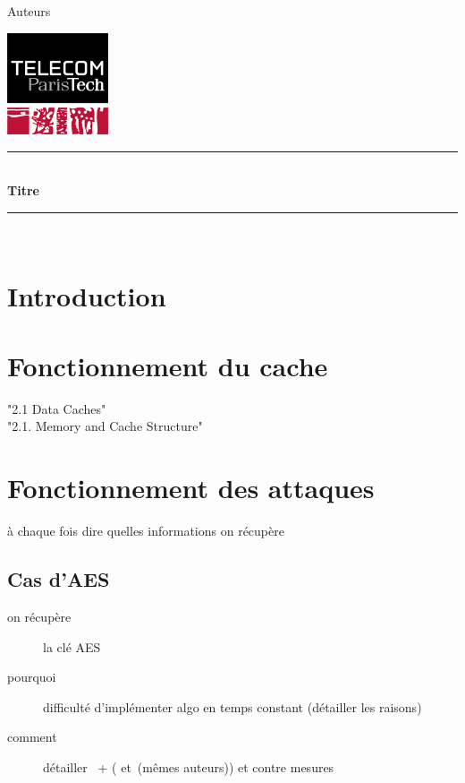 \documentclass[a4paper,11pt]{article}
\newcommand{\HRule}{\rule{\linewidth}{0.5mm}}
\newcommand{\reporttitle}{Titre}
\newcommand{\reportauthor}{Auteurs}
\begin{document}
	

\begin{center}

\begin{minipage}[t]{0.4\textwidth}
  \begin{flushleft} \large
    \reportauthor
  \vfill
  \end{flushleft}
\end{minipage}
\begin{minipage}[t]{0.5\textwidth}
  \begin{flushright}
  \includegraphics [width=30mm]{figures/tpt.jpg} \\[0.5cm]
  \end{flushright}
\end{minipage}
\HRule \\[0.5cm]
{\huge \bfseries \reporttitle}\\[0.3cm]
\HRule \\[1.5cm]

\end{center}

\section*{Introduction}

\section{Fonctionnement du cache}
"2.1 Data Caches"~\cite{brumley2009cache}\\
"2.1. Memory and Cache Structure"~\cite{tromer2010efficient}

\section{Fonctionnement des attaques}

à chaque fois dire quelles informations on récupère

\subsection{Cas d'AES}
\begin{description}
\item[on récupère] la clé AES
\item[pourquoi] difficulté d'implémenter algo en temps constant (détailler les raisons)
\item[comment] détailler~\cite{bernstein2005cache} + (\cite{tromer2010efficient} et~\cite{osvik2006cache}(mêmes auteurs)) et contre mesures 
\end{description}
\end{document}
